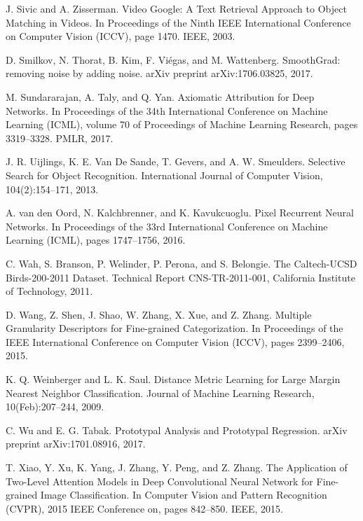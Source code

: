 \documentclass{article}
\theoremstyle{definition}
\theoremstyle{remark}
\begin{document}
\begin{thebibliography}{}
 J. Sivic and A. Zisserman. Video Google: A Text Retrieval Approach to Object Matching in Videos. In Proceedings of the Ninth IEEE International Conference on Computer Vision (ICCV), page 1470. IEEE, 2003.

 D. Smilkov, N. Thorat, B. Kim, F. Viégas, and M. Wattenberg. SmoothGrad: removing noise by adding noise. arXiv preprint arXiv:1706.03825, 2017.

 M. Sundararajan, A. Taly, and Q. Yan. Axiomatic Attribution for Deep Networks. In Proceedings of the 34th International Conference on Machine Learning (ICML), volume 70 of Proceedings of Machine Learning Research, pages 3319–3328. PMLR, 2017.

 J. R. Uijlings, K. E. Van De Sande, T. Gevers, and A. W. Smeulders. Selective Search for Object Recognition. International Journal of Computer Vision, 104(2):154–171, 2013.

 A. van den Oord, N. Kalchbrenner, and K. Kavukcuoglu. Pixel Recurrent Neural Networks. In Proceedings of the 33rd International Conference on Machine Learning (ICML), pages 1747–1756, 2016.

 C. Wah, S. Branson, P. Welinder, P. Perona, and S. Belongie. The Caltech-UCSD Birds-200-2011 Dataset. Technical Report CNS-TR-2011-001, California Institute of Technology, 2011.

 D. Wang, Z. Shen, J. Shao, W. Zhang, X. Xue, and Z. Zhang. Multiple Granularity Descriptors for Fine-grained Categorization. In Proceedings of the IEEE International Conference on Computer Vision (ICCV), pages 2399–2406, 2015.

 K. Q. Weinberger and L. K. Saul. Distance Metric Learning for Large Margin Nearest Neighbor Classification. Journal of Machine Learning Research, 10(Feb):207–244, 2009.

 C. Wu and E. G. Tabak. Prototypal Analysis and Prototypal Regression. arXiv preprint arXiv:1701.08916, 2017.

 T. Xiao, Y. Xu, K. Yang, J. Zhang, Y. Peng, and Z. Zhang. The Application of Two-Level Attention Models in Deep Convolutional Neural Network for Fine-grained Image Classification. In Computer Vision and Pattern Recognition (CVPR), 2015 IEEE Conference on, pages 842–850. IEEE, 2015.


\end{thebibliography}
\end{document}
